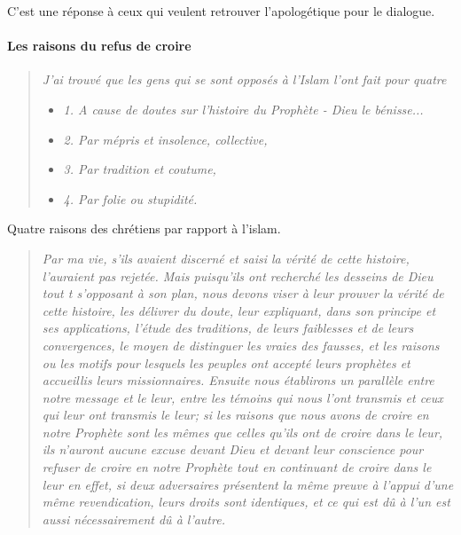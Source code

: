 C'est une réponse à ceux qui veulent retrouver l'apologétique pour le dialogue.

\paragraph{Les raisons du refus de croire}


\begin{quote}
 
\textit{J'ai trouvé que les gens qui se sont opposés à l'Islam l'ont fait pour quatre }
\begin{itemize}
    \item \textit{1. A cause de doutes sur l'histoire du Prophète - Dieu le bénisse...}
    \item \textit{2. Par mépris et insolence, collective,}
    \item \textit{3. Par tradition et coutume,}
    \item \textit{4. Par folie ou stupidité.}
\end{itemize}
\end{quote}
Quatre raisons des chrétiens par rapport à l'islam.

\begin{quote}
    
\textit{Par ma vie, s'ils avaient discerné et saisi la vérité de cette histoire, l'auraient pas rejetée. Mais puisqu'ils ont recherché les desseins de Dieu tout t s'opposant à son plan, nous devons viser à leur prouver la vérité de cette histoire,
les délivrer du doute, leur expliquant, dans son principe et ses applications, l'étude des traditions, de leurs faiblesses et de leurs convergences, le moyen de distinguer les vraies des fausses, et les raisons ou les motifs pour lesquels les peuples ont accepté leurs prophètes et accueillis leurs missionnaires.
Ensuite nous établirons un parallèle entre notre message et le leur, entre les témoins qui nous l'ont transmis et ceux qui leur ont transmis le leur; si les raisons que nous avons de croire en notre Prophète sont les mêmes que celles qu'ils ont de croire dans le leur, ils n'auront aucune excuse devant Dieu et devant leur conscience pour refuser de croire en notre Prophète tout en continuant de croire dans le leur en effet, si deux adversaires présentent la même preuve à l'appui d'une même revendication, leurs droits sont identiques, et ce qui est dû à l'un est aussi nécessairement dû à l'autre.}
 \end{quote}

 


